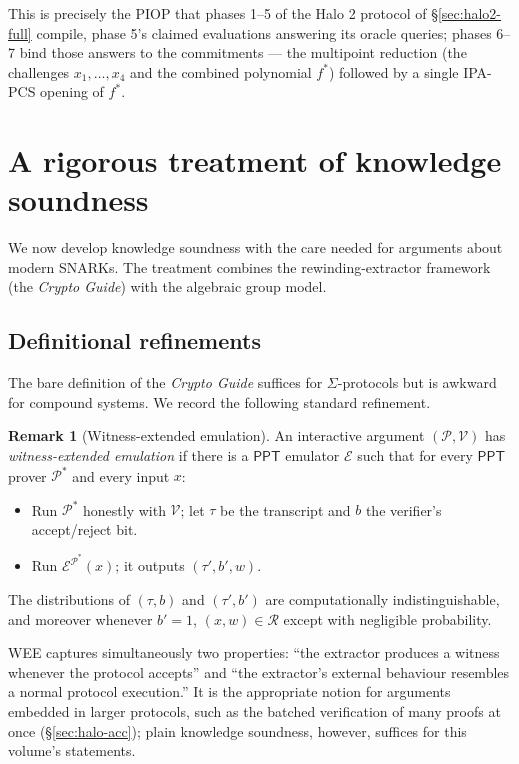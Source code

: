\documentclass[11pt,a4paper]{article}
\theoremstyle{definition}
\newtheorem{remark}[theorem]{Remark}
\newcommand{\PPT}{\mathsf{PPT}}
\newcommand{\Prov}{\mathcal{P}}
\newcommand{\Ver}{\mathcal{V}}
\newcommand{\Ext}{\mathcal{E}}
\newcommand{\Rel}{\mathcal{R}}
\begin{document}
This is precisely the PIOP that phases 1--5 of the Halo 2
protocol of \S\ref{sec:halo2-full} compile, phase 5's claimed evaluations
answering its oracle queries; phases 6--7 bind those answers to the
commitments --- the multipoint reduction (the challenges
$x_1, \dots, x_4$ and the combined polynomial $f^*$) followed by a single
IPA-PCS opening of $f^*$.

\section{A rigorous treatment of knowledge soundness}\label{sec:ks}

We now develop knowledge soundness with the care needed for arguments
about modern SNARKs. The treatment combines the rewinding-extractor
framework (the \emph{Crypto Guide}) with the algebraic group model.

\subsection{Definitional refinements}

The bare definition of the \emph{Crypto Guide} suffices for $\Sigma$-protocols
but is awkward for compound systems. We record the following standard refinement.

\begin{remark}[Witness-extended emulation]\label{def:wee}
An interactive argument $(\Prov, \Ver)$ has \emph{witness-extended
emulation} if there is a $\PPT$ emulator $\Ext$ such that for every $\PPT$
prover $\Prov^*$ and every input $x$:
\begin{itemize}[leftmargin=*]
\item Run $\Prov^*$ honestly with $\Ver$; let $\tau$ be the transcript and
$b$ the verifier's accept/reject bit.
\item Run $\Ext^{\Prov^*}(x)$; it outputs $(\tau', b', w)$.
\end{itemize}
The distributions of $(\tau, b)$ and $(\tau', b')$ are computationally
indistinguishable, and moreover whenever $b' = 1$, $(x, w) \in \Rel$ except
with negligible probability.
\end{remark}

WEE captures simultaneously two properties: ``the extractor produces a witness whenever
the protocol accepts'' and ``the extractor's external behaviour resembles
a normal protocol execution.'' It is the appropriate notion for arguments
embedded in larger protocols, such as the batched verification of many
proofs at once (\S\ref{sec:halo-acc}); plain knowledge soundness,
however, suffices for this volume's statements.
\end{document}
